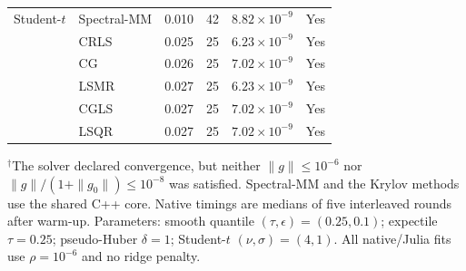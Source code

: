 \begin{table}[htbp]
\begin{tabular}{llrrrc}
Student-$t$
& Spectral-MM & 0.010 & 42 & $8.82\times10^{-9}$ & Yes \\
& CRLS & 0.025 & 25 & $6.23\times10^{-9}$ & Yes \\
& CG & 0.026 & 25 & $7.02\times10^{-9}$ & Yes \\
& LSMR & 0.027 & 25 & $6.23\times10^{-9}$ & Yes \\
& CGLS & 0.027 & 25 & $7.02\times10^{-9}$ & Yes \\
& LSQR & 0.027 & 25 & $7.02\times10^{-9}$ & Yes \\

\bottomrule
\end{tabular}
\par\smallskip
\begin{minipage}{\linewidth}
\footnotesize
$^{\dagger}$The solver declared convergence, but neither $\|g\|\leq 10^{-6}$ nor
$\|g\|/(1+\|g_0\|)\leq 10^{-8}$ was satisfied.
Spectral-MM and the Krylov methods use the shared C++ core.
Native timings are medians of five interleaved rounds after warm-up.
Parameters: smooth quantile $(\tau,\epsilon)=(0.25,0.1)$; expectile $\tau=0.25$;
pseudo-Huber $\delta=1$; Student-$t$ $(\nu,\sigma)=(4,1)$.
All native/Julia fits use $\rho=10^{-6}$ and no ridge penalty.
\end{minipage}
\end{table}

